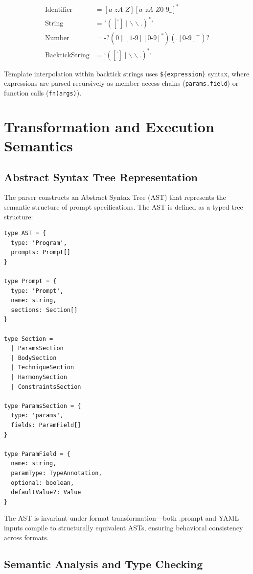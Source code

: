 \documentclass[11pt,a4paper]{article}
\begin{document}
\begin{align*}
\text{Identifier} &= [a\text{-}zA\text{-}Z][a\text{-}zA\text{-}Z0\text{-}9\_]^* \\
\text{String} &= \texttt{"}([^\texttt{"}] \mid \backslash\backslash.)^*\texttt{"} \\
\text{Number} &= \text{-}?(0 \mid [1\text{-}9][0\text{-}9]^*)(\texttt{.}[0\text{-}9]^+)? \\
\text{BacktickString} &= \texttt{`}([^\texttt{`}] \mid \backslash\backslash.)^*\texttt{`}
\end{align*}

Template interpolation within backtick strings uses \texttt{\$\{expression\}} syntax, where expressions are parsed recursively as member access chains (\texttt{params.field}) or function calls (\texttt{fn(args)}).

\section{Transformation and Execution Semantics}

\subsection{Abstract Syntax Tree Representation}

The parser constructs an Abstract Syntax Tree (AST) that represents the semantic structure of prompt specifications. The AST is defined as a typed tree structure:

\begin{lstlisting}[caption=AST type definitions]
type AST = {
  type: 'Program',
  prompts: Prompt[]
}

type Prompt = {
  type: 'Prompt',
  name: string,
  sections: Section[]
}

type Section =
  | ParamsSection
  | BodySection
  | TechniqueSection
  | HarmonySection
  | ConstraintsSection

type ParamsSection = {
  type: 'params',
  fields: ParamField[]
}

type ParamField = {
  name: string,
  paramType: TypeAnnotation,
  optional: boolean,
  defaultValue?: Value
}
\end{lstlisting}

The AST is invariant under format transformation—both .prompt and YAML inputs compile to structurally equivalent ASTs, ensuring behavioral consistency across formats.

\subsection{Semantic Analysis and Type Checking}
\end{document}
